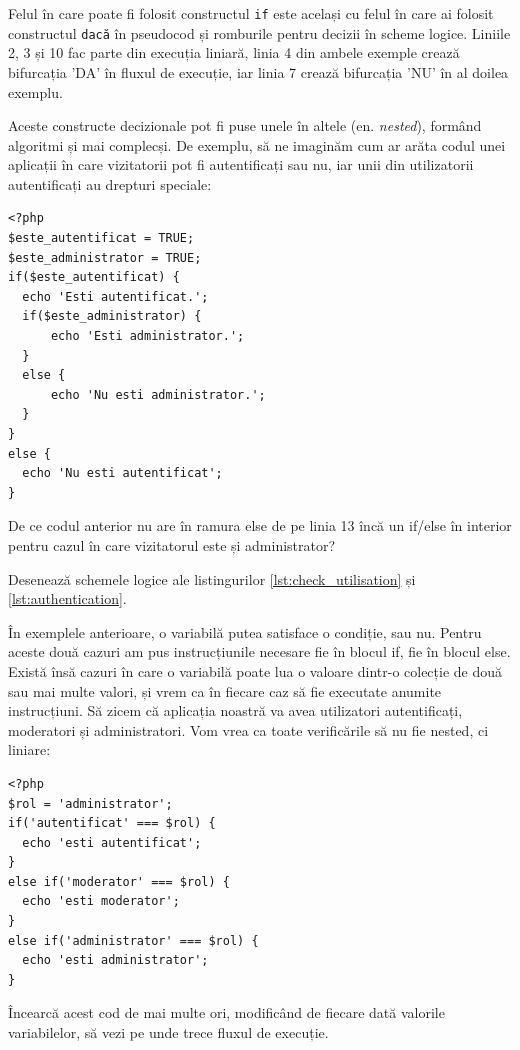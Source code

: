 Felul în care poate fi folosit constructul \texttt{if} este același cu felul în
care ai folosit {\glqq}constructul{\grqq} \texttt{dacă} în pseudocod și romburile pentru
decizii în scheme logice. Liniile 2, 3 și 10 fac parte din execuția liniară,
linia 4 din ambele exemple crează bifurcația 'DA' în fluxul de execuție,
iar linia 7 crează bifurcația 'NU' în al doilea exemplu.


Aceste constructe decizionale pot fi puse unele în altele (en. \textsl{nested}),
formând algoritmi și mai complecși. De exemplu, să ne imaginăm cum
ar arăta codul unei aplicații în care vizitatorii pot fi autentificați
sau nu, iar unii din utilizatorii autentificați au drepturi speciale:
\begin{lstlisting}[caption={Autentificare}, label=lst:authentication]
<?php
$este_autentificat = TRUE;
$este_administrator = TRUE;
if($este_autentificat) {
  echo 'Esti autentificat.';
  if($este_administrator) {
	  echo 'Esti administrator.';
  }
  else {
	  echo 'Nu esti administrator.';
  }
}
else {
  echo 'Nu esti autentificat';
}
\end{lstlisting}

\begin{Exercise}[title={Întrebare de inteligență},difficulty=1]
De ce codul anterior nu are în ramura else de pe linia 13 încă
un if/else în interior pentru cazul în care vizitatorul este
și administrator?
\end{Exercise}


\begin{Exercise}[title={Schemă logică pornind de la cod PHP},difficulty=1]
Desenează schemele logice ale listingurilor 
\ref{lst:check_utilisation} și \ref{lst:authentication}.
\end{Exercise}

În exemplele anterioare, o variabilă putea satisface o condiție, sau nu.
Pentru aceste două cazuri am pus instrucțiunile necesare fie în blocul
{\glqq}if{\grqq}, fie în blocul {\glqq}else{\grqq}.
Există însă cazuri în care o variabilă poate lua o valoare dintr-o colecție de
două sau mai multe valori, și vrem ca în fiecare caz să fie
executate anumite instrucțiuni. Să zicem că aplicația noastră
va avea utilizatori autentificați, moderatori și administratori.
Vom vrea ca toate verificările să nu fie nested, ci liniare:
\begin{lstlisting}
<?php
$rol = 'administrator';
if('autentificat' === $rol) {
  echo 'esti autentificat';
}
else if('moderator' === $rol) {
  echo 'esti moderator';
}
else if('administrator' === $rol) {
  echo 'esti administrator';
}
\end{lstlisting}
Încearcă acest cod de mai multe ori, modificând de fiecare dată valorile
variabilelor, să vezi pe unde trece fluxul de execuție.

